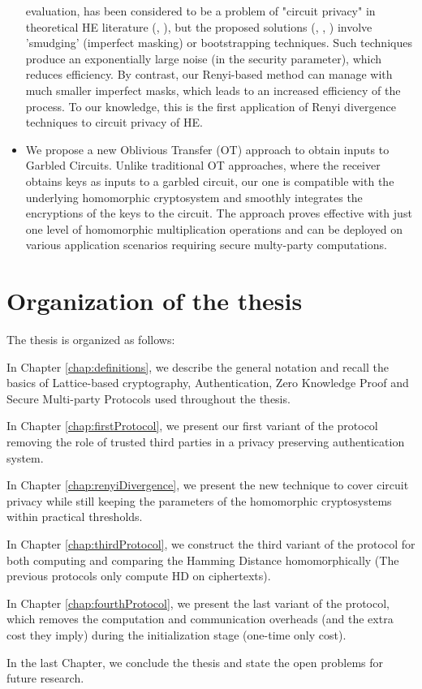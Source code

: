 \begin{itemize}
  evaluation, has been considered to be a problem of "circuit privacy" in theoretical HE
  literature (\cite{sander1999non}, \cite{ishai2007evaluating}), but the
  proposed solutions (\cite{homenc}, \cite{ostrovsky2014maliciously},
  \cite{gentry2010hop}) involve 'smudging' (imperfect masking) or bootstrapping
  techniques. Such techniques produce an exponentially large noise (in the security parameter), which
  reduces efficiency. By contrast, our Renyi-based method can manage with much smaller
  imperfect masks, which leads to an increased efficiency of the process. To our knowledge, this is the first application of
  Renyi divergence techniques to circuit privacy of HE.
\item We propose a new Oblivious Transfer (OT) approach to obtain inputs to
  Garbled Circuits. Unlike traditional OT approaches, where the receiver obtains
  keys as inputs to a garbled circuit, our one is compatible with the
  underlying homomorphic cryptosystem and smoothly integrates the encryptions of the
  keys to the circuit. The approach proves effective with just one level of
  homomorphic multiplication operations and can be deployed on various application
  scenarios requiring secure multy-party computations.
\end{itemize}

\section{Organization of the thesis}
The thesis is organized as follows:
\begin{description}
\item In Chapter \ref{chap:definitions}, we describe the general notation and
  recall the basics of Lattice-based cryptography, Authentication, Zero
  Knowledge Proof and Secure Multi-party Protocols used throughout the
  thesis.
\item In Chapter \ref{chap:firstProtocol}, we present our first variant of the
  protocol removing the role of trusted third parties in a privacy
  preserving authentication system.
\item In Chapter \ref{chap:renyiDivergence}, we present the new technique to
  cover circuit privacy while still keeping the parameters of the homomorphic
  cryptosystems within practical thresholds.
\item In Chapter \ref{chap:thirdProtocol}, we construct the third variant of the
  protocol for both computing and comparing the Hamming Distance
  homomorphically (The previous protocols only compute HD on ciphertexts).
\item In Chapter \ref{chap:fourthProtocol}, we present the last variant of the
  protocol, which removes the computation and communication overheads (and the
  extra cost they imply) during the initialization stage (one-time only cost).
\item In the last Chapter, we conclude the thesis and state the open problems for
  future research.
\end{description}
\label{sec:introOrganize}
